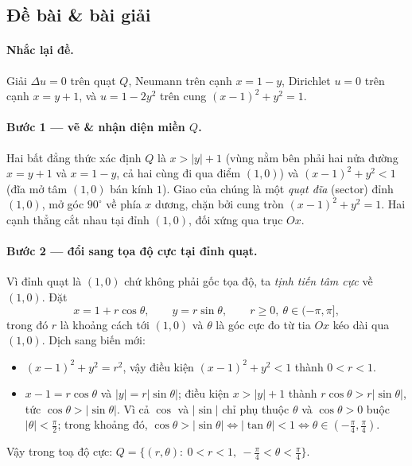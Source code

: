\subsection*{Đề bài \& bài giải}
\paragraph{Nhắc lại đề.} Giải $\Delta u=0$ trên quạt $Q$, Neumann trên cạnh $x=1-y$, Dirichlet $u=0$ trên cạnh $x=y+1$, và $u=1-2y^2$ trên cung $(x-1)^2+y^2=1$.

\paragraph{Bước 1 --- vẽ \& nhận diện miền $Q$.}
Hai bất đẳng thức xác định $Q$ là $x>|y|+1$ (vùng nằm bên phải hai nửa đường $x=y+1$ và $x=1-y$, cả hai cùng đi qua điểm $(1,0)$) và $(x-1)^2+y^2<1$ (đĩa mở tâm $(1,0)$ bán kính $1$). Giao của chúng là một \emph{quạt đĩa} (sector) đỉnh $(1,0)$, mở góc $90^\circ$ về phía $x$ dương, chặn bởi cung tròn $(x-1)^2+y^2=1$. Hai cạnh thẳng cắt nhau tại đỉnh $(1,0)$, đối xứng qua trục $Ox$.

\paragraph{Bước 2 --- đổi sang tọa độ cực tại đỉnh quạt.}
Vì đỉnh quạt là $(1,0)$ chứ không phải gốc tọa độ, ta \emph{tịnh tiến tâm cực} về $(1,0)$. Đặt
\[
  x=1+r\cos\theta,\qquad y=r\sin\theta,\qquad r\ge0,\ \theta\in(-\pi,\pi],
\]
trong đó $r$ là khoảng cách tới $(1,0)$ và $\theta$ là góc cực đo từ tia $Ox$ kéo dài qua $(1,0)$. Dịch sang biến mới:
\begin{itemize}
  \item $(x-1)^2+y^2=r^2$, vậy điều kiện $(x-1)^2+y^2<1$ thành $0<r<1$.
  \item $x-1=r\cos\theta$ và $|y|=r|\sin\theta|$; điều kiện $x>|y|+1$ thành $r\cos\theta>r|\sin\theta|$, tức $\cos\theta>|\sin\theta|$. Vì cả $\cos$ và $|\sin|$ chỉ phụ thuộc $\theta$ và $\cos\theta>0$ buộc $|\theta|<\tfrac{\pi}{2}$; trong khoảng đó, $\cos\theta>|\sin\theta|\Leftrightarrow|\tan\theta|<1\Leftrightarrow\theta\in(-\tfrac{\pi}{4},\tfrac{\pi}{4})$.
\end{itemize}
Vậy trong toạ độ cực: $Q=\{(r,\theta):\ 0<r<1,\ -\tfrac{\pi}{4}<\theta<\tfrac{\pi}{4}\}$.

